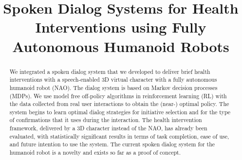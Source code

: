 \documentclass[letterpaper]{article}
\begin{document}
%
\title{Spoken Dialog Systems for Health Interventions using Fully Autonomous Humanoid Robots}


\maketitle
\begin{abstract}
We integrated a spoken dialog system that we developed to deliver brief health interventions with a 
speech-enabled 3D virtual character with a fully autonomous humanoid robot (NAO). The dialog 
system is based on Markov decision processes (MDPs). We use model free off-policy algorithms in 
reinforcement learning (RL) with the data  collected from real user interactions to obtain the 
(near-) optimal policy. The system begins to learn optimal dialog strategies for initiative 
selection and for the type of confirmations that it uses during the interaction. The health 
intervention framework, delivered by a 3D character instead of the NAO, has already been evaluated, 
with statistically significant results in terms of task completion, ease of use, and future 
intention to use the system.  The current spoken dialog system for the humanoid robot is a novelty 
and exists so far as a proof of concept.
\end{abstract}

\end{document}
